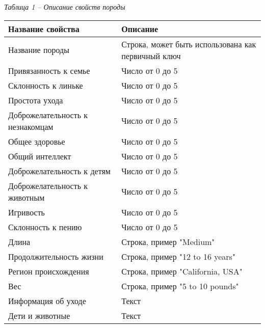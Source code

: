 \noindent\textit{Таблица 1 -- Описание свойств породы}
\begin{longtable}{|p{7.5cm}|p{7.5cm}|}
    \hline
    \textbf{Название свойства}       & \textbf{Описание}                                  \\\hline
    Название породы                  & Строка, может быть использована как первичный ключ \\\hline
    Привязанность к семье            & Число от 0 до 5                                    \\\hline
    Склонность к линьке              & Число от 0 до 5                                    \\\hline
    Простота ухода                   & Число от 0 до 5                                    \\\hline
    Доброжелательность к незнакомцам & Число от 0 до 5                                    \\\hline
    Общее здоровье                   & Число от 0 до 5                                    \\\hline
    Общий интеллект                  & Число от 0 до 5                                    \\\hline
    Доброжелательность к детям       & Число от 0 до 5                                    \\\hline
    Доброжелательность к животным    & Число от 0 до 5                                    \\\hline
    Игривость                        & Число от 0 до 5                                    \\\hline
    Склонность к пению               & Число от 0 до 5                                    \\\hline
    Длина                            & Строка, пример "Medium"                            \\\hline
    Продолжительность жизни          & Строка, пример "12 to 16 years"                    \\\hline
    Регион происхождения             & Строка, пример "California, USA"                   \\\hline
    Вес                              & Строка, пример "5 to 10 pounds"                    \\\hline
    Информация об уходе              & Текст                                              \\\hline
    Дети и животные                  & Текст                                              \\\hline

\end{longtable}
